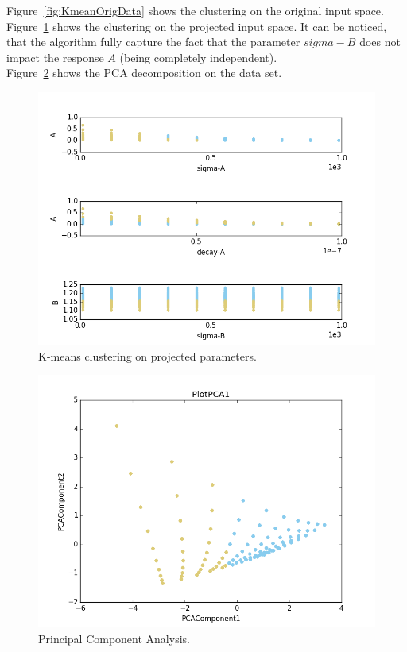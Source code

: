 Figure~\ref{fig:KmeanOrigData} shows the clustering on the original
input space. 
\\Figure~\ref{fig:KmeanProjected} shows the clustering on the projected
input space. It can be noticed, that the algorithm fully capture the fact
that the parameter $sigma-B$ does not impact the response $A$ (being completely independent).
\\Figure~\ref{fig:PCAplot} shows the PCA decomposition on the data set.
 \begin{figure}[h!]
  \centering
  \includegraphics[scale=0.7]{pics/dataminingPlotallK-means.png}
  \caption{K-means clustering on projected parameters.}
  \label{fig:KmeanProjected}
 \end{figure}

 \begin{figure}[h!]
  \centering
  \includegraphics[scale=0.7]{pics/dataminingPCA.png}
  \caption{Principal Component Analysis.}
  \label{fig:PCAplot}
 \end{figure}
 